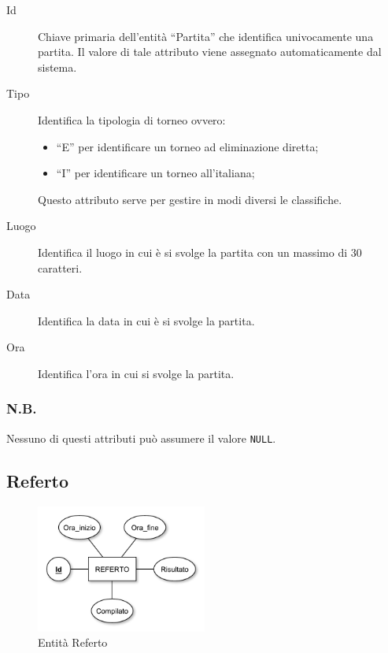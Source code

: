 		\begin{description}
			
			\item[Id]
			Chiave primaria dell'entità ``Partita'' che identifica univocamente una partita. Il valore di tale attributo viene assegnato automaticamente dal sistema.
			
			\item[Tipo]
			Identifica la tipologia di torneo ovvero:
			\begin{itemize}
				\item
				``E'' per identificare un torneo ad eliminazione diretta;
				\item
				``I'' per identificare un torneo all'italiana;
			\end{itemize}
			Questo attributo serve per gestire in modi diversi le classifiche.
			
			\item[Luogo]
			Identifica il luogo in cui è si svolge la partita con un massimo di 30 caratteri.
			
			\item[Data]
			Identifica la data in cui è si svolge la partita.
			
			\item[Ora]
			Identifica l'ora in cui si svolge la partita.
			
		\end{description}
		
		\subsubsection*{N.B.}
		Nessuno di questi attributi può assumere il valore \texttt{NULL}.
	
	\subsection{Referto}
		
		\begin{figure}[h]
			\centering
			\includegraphics[width=0.5\textwidth]
			{immagini/08-referto}
			
			\caption{Entità Referto}
			\label{entita-referto}
		\end{figure}
		
